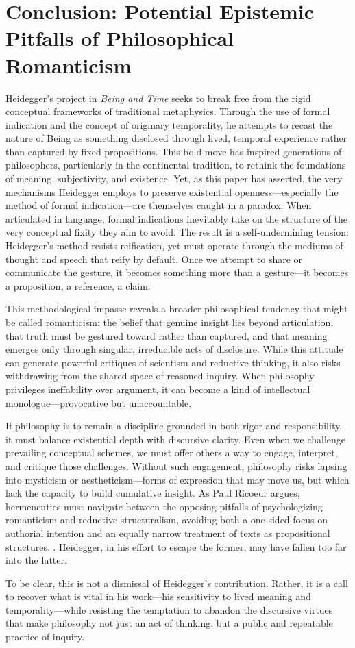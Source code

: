 \documentclass{article}
\begin{document}
\section*{Conclusion: Potential Epistemic Pitfalls of Philosophical Romanticism}

Heidegger’s project in \textit{Being and Time} seeks to break free from the rigid conceptual frameworks of traditional metaphysics. Through the use of formal indication and the concept of originary temporality, he attempts to recast the nature of Being as something disclosed through lived, temporal experience rather than captured by fixed propositions. This bold move has inspired generations of philosophers, particularly in the continental tradition, to rethink the foundations of meaning, subjectivity, and existence.
\newpage
Yet, as this paper has asserted, the very mechanisms Heidegger employs to preserve existential openness—especially the method of formal indication—are themselves caught in a paradox. When articulated in language, formal indications inevitably take on the structure of the very conceptual fixity they aim to avoid. The result is a self-undermining tension: Heidegger’s method resists reification, yet must operate through the mediums of thought and speech that reify by default. Once we attempt to share or communicate the gesture, it becomes something more than a gesture—it becomes a proposition, a reference, a claim.

This methodological impasse reveals a broader philosophical tendency that might be called romanticism: the belief that genuine insight lies beyond articulation, that truth must be gestured toward rather than captured, and that meaning emerges only through singular, irreducible acts of disclosure. While this attitude can generate powerful critiques of scientism and reductive thinking, it also risks withdrawing from the shared space of reasoned inquiry. When philosophy privileges ineffability over argument, it can become a kind of intellectual monologue—provocative but unaccountable.

If philosophy is to remain a discipline grounded in both rigor and responsibility, it must balance existential depth with discursive clarity. Even when we challenge prevailing conceptual schemes, we must offer others a way to engage, interpret, and critique those challenges. Without such engagement, philosophy risks lapsing into mysticism or aestheticism—forms of expression that may move us, but which lack the capacity to build cumulative insight. As Paul Ricoeur argues, hermeneutics must navigate between the opposing pitfalls of psychologizing romanticism and reductive structuralism, avoiding both a one-sided focus on authorial intention and an equally narrow treatment of texts as propositional structures. \parencite[pp.~22-23]{ricoeur1976}. Heidegger, in his effort to escape the former, may have fallen too far into the latter.

To be clear, this is not a dismissal of Heidegger’s contribution. Rather, it is a call to recover what is vital in his work—his sensitivity to lived meaning and temporality—while resisting the temptation to abandon the discursive virtues that make philosophy not just an act of thinking, but a public and repeatable practice of inquiry.

\newpage
\printbibliography
\end{document}
